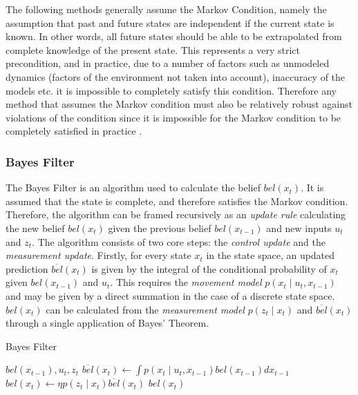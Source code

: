 \documentclass[english]{article}
\begin{document}
The following methods generally assume the Markov Condition, namely the assumption that past and future states are independent if the current state is known. In other words, all future states should be able to be extrapolated from complete knowledge of the present state. This represents a very strict precondition, and in practice, due to a number of factors such as unmodeled dynamics (factors of the environment not taken into account), inaccuracy of the models etc. it is impossible to completely satisfy this condition. Therefore any method that assumes the Markov condition must also be relatively robust against violations of the condition since it is impossible for the Markov condition to be completely satisfied in practice \cite[pp 33]{probrob}.

\subsubsection{Bayes Filter}


The Bayes Filter is an algorithm used to calculate the belief $bel(x_t)$. It is assumed that the state is complete, and therefore satisfies the Markov condition. Therefore, the algorithm can be framed recursively as an \emph{update rule} calculating the new belief $bel({x_t})$ given the previous belief $bel(x_{t-1})$ and new inputs $u_t$ and $z_t$. The algorithm consists of two core steps: the \emph{control update} and the \emph{measurement update}. Firstly, for every state $x_t$ in the state space, an updated prediction $\overline{bel}(x_t)$ is given by the integral of the conditional probability of $x_t$ given $bel(x_{t-1})$ and $u_t$\cite{probrob}. This requires the \emph{movement model} $p(x_t \mid u_t,x_{t-1})$ and may be given by a direct summation in the case of a discrete state space. $bel(x_t)$ can be calculated from the \emph{measurement model} $p(z_t \mid x_t)$ and $\overline{bel}(x_t)$ through a single application of Bayes' Theorem.

\begin{algorithm}[H]
\caption{Bayes Filter}
\label{alg:bayes}
\begin{algorithmic}
	\REQUIRE $bel(x_{t-1}), u_t, z_t$
        \STATE $\overline{bel}(x_t) \leftarrow \int p(x_t \mid u_t, x_{t-1})bel(x_{t-1}) dx_{t-1}$
        \STATE $bel(x_t) \leftarrow \eta p(z_t \mid x_t) \overline{bel}(x_t)$
        \ENDFOR
        \RETURN $bel(x_t)$
\end{algorithmic}
\end{algorithm}
\end{document}
